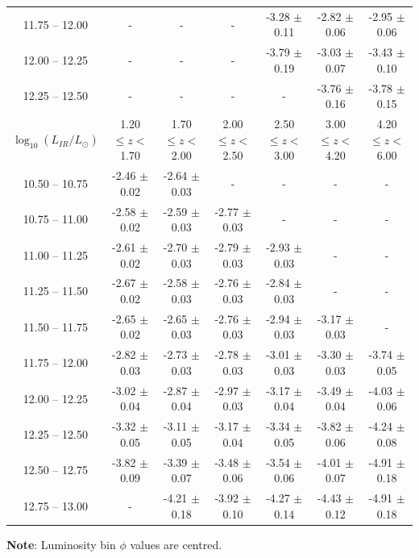 \begin{table}
\begin{center}
\begin{tabular}{@{}ccccccc@{}}
        11.75 -- 12.00 & -                  & -                 & -                 & -3.28 $\pm$ 0.11  & -2.82 $\pm$ 0.06  & -2.95 $\pm$ 0.06 \\
        12.00 -- 12.25 & -                  & -                 & -                 & -3.79 $\pm$ 0.19  & -3.03 $\pm$ 0.07  & -3.43 $\pm$ 0.10 \\
        12.25 -- 12.50 & -                  & -                 & -                 & -                 & -3.76 $\pm$ 0.16  & -3.78 $\pm$ 0.15 \\
        \hline
        $\log_{10}(L_{IR}/L_{\odot})$ & 1.20 $\leq z <$ 1.70 & 1.70 $\leq z <$ 2.00 & 2.00 $\leq z <$ 2.50 & 2.50 $\leq z <$ 3.00 & 3.00 $\leq z <$ 4.20 & 4.20 $\leq z <$ 6.00  \\
        \hline
        10.50 -- 10.75 & -2.46 $\pm$ 0.02   & -2.64 $\pm$ 0.03  & - & - & - & - \\
        10.75 -- 11.00 & -2.58 $\pm$ 0.02   & -2.59 $\pm$ 0.03  & -2.77 $\pm$ 0.03  & - & - & - \\
        11.00 -- 11.25 & -2.61 $\pm$ 0.02   & -2.70 $\pm$ 0.03  & -2.79 $\pm$ 0.03  & -2.93 $\pm$ 0.03  & - & - \\
        11.25 -- 11.50 & -2.67 $\pm$ 0.02   & -2.58 $\pm$ 0.03  & -2.76 $\pm$ 0.03  & -2.84 $\pm$ 0.03  & - & - \\
        11.50 -- 11.75 & -2.65 $\pm$ 0.02   & -2.65 $\pm$ 0.03  & -2.76 $\pm$ 0.03  & -2.94 $\pm$ 0.03  & -3.17 $\pm$ 0.03 & - \\
        11.75 -- 12.00 & -2.82 $\pm$ 0.03   & -2.73 $\pm$ 0.03  & -2.78 $\pm$ 0.03  & -3.01 $\pm$ 0.03  & -3.30 $\pm$ 0.03 & -3.74 $\pm$ 0.05 \\
        12.00 -- 12.25 & -3.02 $\pm$ 0.04   & -2.87 $\pm$ 0.04  & -2.97 $\pm$ 0.03  & -3.17 $\pm$ 0.04  & -3.49 $\pm$ 0.04 & -4.03 $\pm$ 0.06 \\
        12.25 -- 12.50 & -3.32 $\pm$ 0.05   & -3.11 $\pm$ 0.05  & -3.17 $\pm$ 0.04  & -3.34 $\pm$ 0.05  & -3.82 $\pm$ 0.06 & -4.24 $\pm$ 0.08 \\
        12.50 -- 12.75 & -3.82 $\pm$ 0.09   & -3.39 $\pm$ 0.07  & -3.48 $\pm$ 0.06  & -3.54 $\pm$ 0.06  & -4.01 $\pm$ 0.07 & -4.91 $\pm$ 0.18 \\
        12.75 -- 13.00 & -                  & -4.21 $\pm$ 0.18  & -3.92 $\pm$ 0.10  & -4.27 $\pm$ 0.14  & -4.43 $\pm$ 0.12 & -4.91 $\pm$ 0.18
        \botrule
    \end{tabular}
    \end{center}
    \begin{tabnote}
        {\textbf{Note}: Luminosity bin $\phi$ values are centred.}\tnp
    \end{tabnote}
\end{table}

